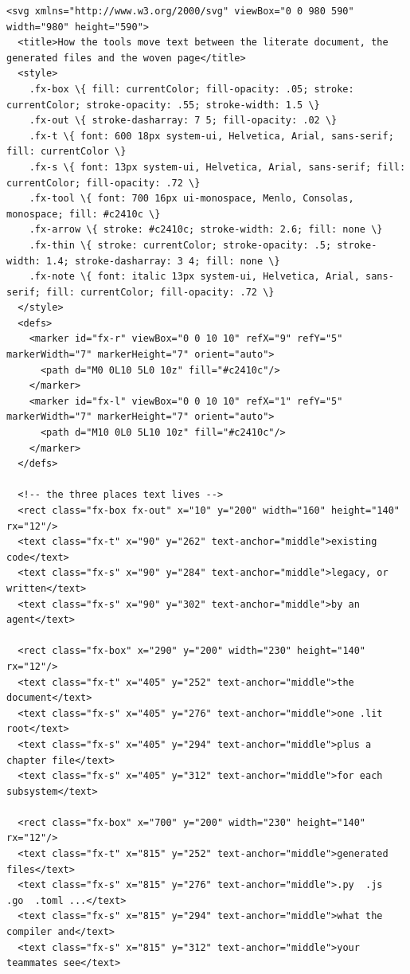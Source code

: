 \documentclass[10pt,a4paper]{article}
\begin{document}
\begin{Verbatim}
<svg xmlns="http://www.w3.org/2000/svg" viewBox="0 0 980 590" width="980" height="590">
  <title>How the tools move text between the literate document, the generated files and the woven page</title>
  <style>
    .fx-box \{ fill: currentColor; fill-opacity: .05; stroke: currentColor; stroke-opacity: .55; stroke-width: 1.5 \}
    .fx-out \{ stroke-dasharray: 7 5; fill-opacity: .02 \}
    .fx-t \{ font: 600 18px system-ui, Helvetica, Arial, sans-serif; fill: currentColor \}
    .fx-s \{ font: 13px system-ui, Helvetica, Arial, sans-serif; fill: currentColor; fill-opacity: .72 \}
    .fx-tool \{ font: 700 16px ui-monospace, Menlo, Consolas, monospace; fill: #c2410c \}
    .fx-arrow \{ stroke: #c2410c; stroke-width: 2.6; fill: none \}
    .fx-thin \{ stroke: currentColor; stroke-opacity: .5; stroke-width: 1.4; stroke-dasharray: 3 4; fill: none \}
    .fx-note \{ font: italic 13px system-ui, Helvetica, Arial, sans-serif; fill: currentColor; fill-opacity: .72 \}
  </style>
  <defs>
    <marker id="fx-r" viewBox="0 0 10 10" refX="9" refY="5" markerWidth="7" markerHeight="7" orient="auto">
      <path d="M0 0L10 5L0 10z" fill="#c2410c"/>
    </marker>
    <marker id="fx-l" viewBox="0 0 10 10" refX="1" refY="5" markerWidth="7" markerHeight="7" orient="auto">
      <path d="M10 0L0 5L10 10z" fill="#c2410c"/>
    </marker>
  </defs>

  <!-- the three places text lives -->
  <rect class="fx-box fx-out" x="10" y="200" width="160" height="140" rx="12"/>
  <text class="fx-t" x="90" y="262" text-anchor="middle">existing code</text>
  <text class="fx-s" x="90" y="284" text-anchor="middle">legacy, or written</text>
  <text class="fx-s" x="90" y="302" text-anchor="middle">by an agent</text>

  <rect class="fx-box" x="290" y="200" width="230" height="140" rx="12"/>
  <text class="fx-t" x="405" y="252" text-anchor="middle">the document</text>
  <text class="fx-s" x="405" y="276" text-anchor="middle">one .lit root</text>
  <text class="fx-s" x="405" y="294" text-anchor="middle">plus a chapter file</text>
  <text class="fx-s" x="405" y="312" text-anchor="middle">for each subsystem</text>

  <rect class="fx-box" x="700" y="200" width="230" height="140" rx="12"/>
  <text class="fx-t" x="815" y="252" text-anchor="middle">generated files</text>
  <text class="fx-s" x="815" y="276" text-anchor="middle">.py  .js  .go  .toml ...</text>
  <text class="fx-s" x="815" y="294" text-anchor="middle">what the compiler and</text>
  <text class="fx-s" x="815" y="312" text-anchor="middle">your teammates see</text>


\end{Verbatim}
\end{document}
